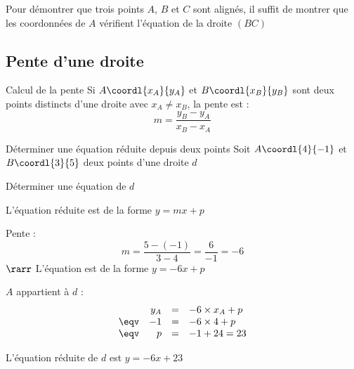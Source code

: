 \begin{rem}
	Pour démontrer que trois points $A$, $B$ et $C$ sont alignés, il suffit de montrer que les coordonnées de $A$ vérifient l'équation de la droite $(BC)$
\end{rem}
\newpage
\subsection{Pente d'une droite}

\begin{prop}{Calcul de la pente}
	Si $A\coordl{x_A}{y_A}$ et $B\coordl{x_B}{y_B}$ sont deux points distincts d'une droite avec $x_A \neq x_B$, la pente est :
	\[
		\boxed{m = \frac{y_B - y_A}{x_B - x_A}}
	\]
\end{prop}

\begin{methode}{Déterminer une équation réduite depuis deux points}
	Soit $A\coordl{4}{-1}$ et $B\coordl{3}{5}$ deux points d'une droite $d$

	Déterminer une équation de $d$

	\begin{correction}
		L'équation réduite est de la forme $y = mx + p$

		\bi
		\item Pente : $$m = \dfrac{5-(-1)}{3-4} = \dfrac{6}{-1} = -6$$
		$\rarr$ L'équation est de la forme $y = -6x + p$
		\item $A$ appartient à $d$ :
		$$
			\begin{array}{rrcl}
				     & y_A & = & -6\times x_A + p \\
				\eqv & -1  & = & -6 \times 4 + p  \\
				\eqv & p   & = & -1 + 24 = 23
			\end{array}$$
		\ei

		L'équation réduite de $d$ est $y = -6x + 23$
	\end{correction}
\end{methode}

